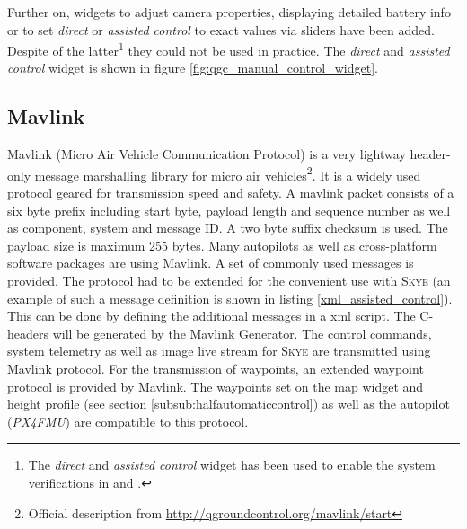 
Further on, widgets to adjust camera properties, displaying detailed battery info or to set \textit{direct} or \textit{assisted control} to exact values via sliders have been added. Despite of the latter\footnote{The \textit{direct} and \textit{assisted control} widget has been used to enable the system verifications in \cite{meiermueri} and \cite{weichart}.} they could not be used in practice. The \textit{direct} and \textit{assisted control} widget is shown in figure \ref{fig:qgc_manual_control_widget}.

\subsection{Mavlink}
\label{subsec:mavlink}
Mavlink (Micro Air Vehicle Communication Protocol) is a very lightway header-only message marshalling library for micro air vehicles\footnote{Official description from \url{http://qgroundcontrol.org/mavlink/start}}. It is a widely used protocol geared for transmission speed and safety. A mavlink packet consists of a six byte prefix including start byte, payload length and sequence number as well as component, system and message ID. A two byte suffix checksum is used. The payload size is maximum 255 bytes. Many autopilots as well as cross-platform software packages are using Mavlink.
A set of commonly used messages is provided. The protocol had to be extended for the convenient use with \textsc{Skye} (an example
 of such a message definition is shown in listing \ref{xml_assisted_control}). This can be done by defining the additional messages in a xml script. The C-headers will be generated by the Mavlink Generator. The control commands, system telemetry as well as image live stream for \textsc{Skye} are transmitted using Mavlink protocol. For the transmission of waypoints, an extended waypoint protocol is provided by Mavlink. The waypoints set on the map widget and height profile (see section \ref{subsub:halfautomaticcontrol}) as well as the autopilot (\textit{PX4FMU}) are compatible to this protocol.

